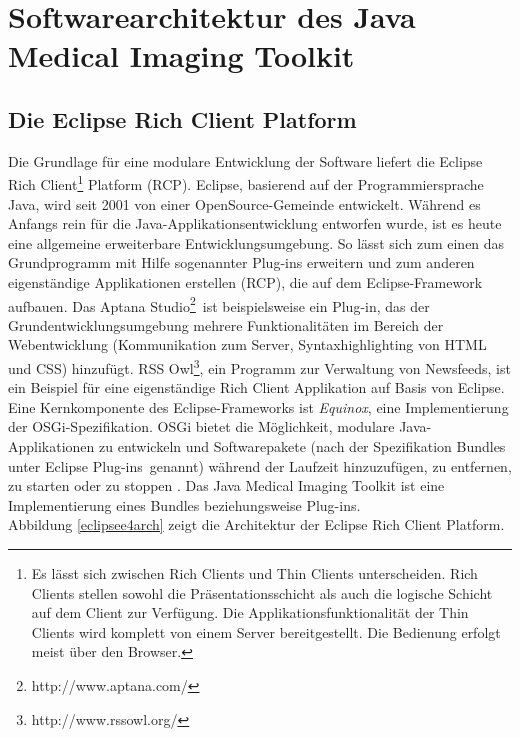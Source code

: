 \chapter{Softwarearchitektur des Java Medical Imaging Toolkit} \label{architecture}

\section{Die Eclipse Rich Client Platform}

Die Grundlage für eine modulare Entwicklung der Software liefert die Eclipse Rich Client\footnote{Es lässt sich zwischen Rich Clients und Thin Clients unterscheiden. Rich Clients stellen sowohl die Präsentationsschicht als auch die logische Schicht auf dem Client zur Verfügung. Die Applikationsfunktionalität der Thin Clients wird komplett von einem Server bereitgestellt. Die Bedienung erfolgt meist über den Browser.} Platform (RCP). Eclipse, basierend auf der Programmiersprache Java, wird seit 2001 von einer OpenSource-Gemeinde entwickelt\cite{vogel:eclipseoverview}. Während es Anfangs rein für die Java-Applikationsentwicklung entworfen wurde, ist es heute eine allgemeine erweiterbare Entwicklungsumgebung. So lässt sich zum einen das Grundprogramm mit Hilfe sogenannter Plug-ins erweitern und zum anderen eigenständige Applikationen erstellen (RCP), die auf dem Eclipse-Framework aufbauen. Das \glqq Aptana Studio\footnote{http://www.aptana.com/}\grqq\ ist beispielsweise ein Plug-in, das der Grundentwicklungsumgebung mehrere Funktionalitäten im Bereich der Webentwicklung (Kommunikation zum Server, Syntaxhighlighting von HTML und CSS) hinzufügt. RSS Owl\footnote{http://www.rssowl.org/}, ein Programm zur Verwaltung von Newsfeeds, ist ein Beispiel für eine eigenständige Rich Client Applikation auf Basis von Eclipse.\\
Eine Kernkomponente des Eclipse-Frameworks ist \textit{Equinox}, eine Implementierung der OSGi-Spezifikation. OSGi bietet die Möglichkeit, modulare Java-Applikationen zu entwickeln und Softwarepakete (nach der Spezifikation \glqq Bundles\grqq\, unter Eclipse \glqq Plug-ins\grqq\ genannt) während der Laufzeit hinzuzufügen, zu entfernen, zu starten oder zu stoppen \cite{vogel:e4overview}. Das Java Medical Imaging Toolkit ist eine Implementierung eines Bundles beziehungsweise Plug-ins.\\
Abbildung \ref{eclipsee4arch} zeigt die Architektur der Eclipse Rich Client Platform.

